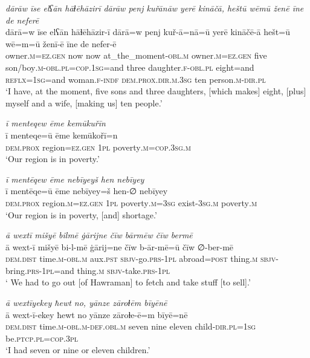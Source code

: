 \ea \label{ŽM.16}
\textit{dārāw īse elʕān hāɫēhāzirī dārāw penj kuřānāw yerē kināčā, heštū wēmū ženē īne de neferē} \\ 
\gll dārā=w īse elʕān hāɫēhāzir-ī dārā=w penj kuř-ā=nā=ū yerē kināčē-ā hešt=ū wē=m=ū ženī-ē īne de nefer-ē \\ 
 owner\textsc{.m}\textsc{=ez.gen} now now at\_the\_moment\textsc{-obl}\textsc{.m} owner\textsc{.m}\textsc{=ez.gen} five son/boy\textsc{.m}\textsc{-obl}\textsc{.pl}\textsc{=cop}\textsc{.\textsc{1sg}}=and three daughter\textsc{.f}\textsc{-obl}\textsc{.pl} eight=and \textsc{reflx}\textsc{=\textsc{1sg}}=and woman\textsc{.f}\textsc{-indf} \textsc{dem.prox}\textsc{.dir}\textsc{.m}\textsc{.3sg} ten person\textsc{.m}\textsc{-dir}\textsc{.pl} \\ 
\glt `I have, at the moment, five sons and three daughters, [which makes] eight, [plus] myself and a wife, [making us] ten people.'
\z 
 
\ea \label{ŽM.19}
\textit{ī menteqew ēme kemūkuřīn} \\ 
\gll ī menteqe=ū ēme kemūkořī=n \\ 
 \textsc{dem.prox} region\textsc{=ez.gen} \textsc{1pl} poverty\textsc{.m}\textsc{=cop}\textsc{.3sg}\textsc{.m} \\ 
\glt `Our region is in poverty.'
\z 
 
\ea \label{ŽM.21}
\textit{ī mentēqew ēme nebīyeyš hen nebīyey} \\ 
\gll ī mentēqe=ū ēme nebīyey=š hen-∅ nebīyey \\ 
 \textsc{dem.prox} region\textsc{.m}\textsc{=ez.gen} \textsc{1pl} poverty\textsc{.m}\textsc{=3sg} exist\textsc{-3sg}\textsc{.m} poverty\textsc{.m} \\ 
\glt `Our region is in poverty, [and] shortage.'
\z 
 
\ea \label{ŽM.22}
\textit{ā wextī mišyē bilmē ġārijne čīw bārmēw čīw bermē} \\ 
\gll ā wext-ī mišyē bi-l-mē ġārij=ne čīw b-ār-mē=ū čīw ∅-ber-mē \\ 
 \textsc{dem.dist} time\textsc{.m}\textsc{-obl}\textsc{.m} aux\textsc{.pst} \textsc{sbjv-}go\textsc{.prs}\textsc{-\textsc{1pl}} abroad\textsc{=\textsc{post}} thing\textsc{.m} \textsc{sbjv-}bring\textsc{.prs}\textsc{-\textsc{1pl}}=and thing\textsc{.m} \textsc{sbjv-}take\textsc{.prs}\textsc{-\textsc{1pl}} \\ 
\glt ` We had to go out [of Hawraman] to fetch and take stuff [to sell].'
\z 
 
\ea \label{ŽM.26}
\textit{ā wextīyekey ħewt no, yānze zāroɫēm bīyēnē} \\ 
\gll ā wext-ī-ekey ħewt no yānze zāroɫe-ē=m bīyē=nē \\ 
 \textsc{dem.dist} time\textsc{.m}\textsc{-obl}\textsc{.m}\textsc{-def}\textsc{.obl}\textsc{.m} seven nine eleven child\textsc{-dir}\textsc{.pl}\textsc{=\textsc{1sg}} be\textsc{.ptcp}\textsc{.pl}\textsc{=cop}\textsc{.3pl} \\ 
\glt `I had seven or nine or eleven children.'
\z 
 
